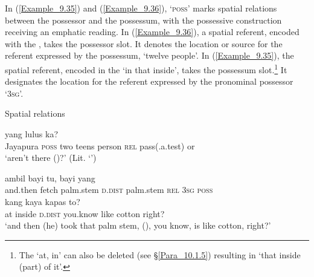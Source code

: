 In (\ref{Example_9.35}) and (\ref{Example_9.36}),  ‘\textsc{poss}’ marks spatial relations between the possessor and the possessum, with the possessive construction receiving an emphatic reading. In (\ref{Example_9.36}), a spatial referent, encoded with the  , takes the possessor slot. It denotes the location or source for the referent expressed by the possessum,  ‘twelve people’. In (\ref{Example_9.35}), the spatial referent, encoded in the   ‘in that inside’, takes the possessum slot.\footnote{The    ‘at, in’ can also be deleted (see §\ref{Para_10.1.5}) resulting in  ‘that inside (part) of it’.} It designates the location for the referent expressed by the pronominal possessor  ‘\textsc{3sg}’.



\begin{styleExampleTitle}
Spatial  relations
\end{styleExampleTitle}

\ea
\label{Example_9.35}
 {} {} {} {} {yang} {lulus} {ka?}\\ %
 Jayapura  \textsc{poss}  two  teens  person  \textsc{rel}  pass(.a.test)  or\\
\glt 
‘aren’t there  ()?’ (Lit. ‘’) \textstyleExampleSource{[081025-003-Cv.0311]}
\z

\ea
\label{Example_9.36}
 {{ambil}} {{bayi}} {{tu,}} {{bayi}} {yang} {} {}\\ %
 {and.then}  {fetch}  {palm.stem}  {\textsc{d.dist}}  {palm.stem}  \textsc{rel}  \textsc{3sg}  \textsc{poss}\\
\gll {}  {}  {}  {kang}  {kaya}  kapas  {to?}\\
 at  {inside}  {\textsc{d.dist}}  {you.know}  {like}  cotton  {right?}\\
\glt 
‘and then (he) took that palm stem,  (), you know, is like cotton, right?’ \textstyleExampleSource{[080922-010a-CvNF.0073]}
\z



